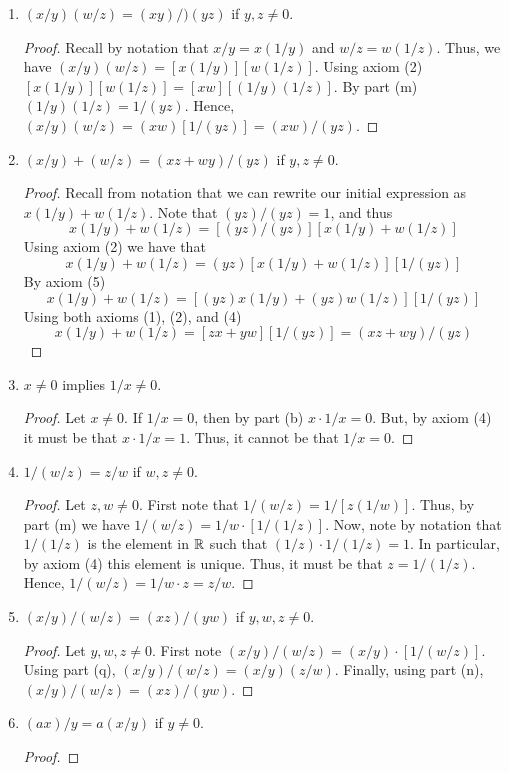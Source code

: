 \documentclass[12pt]{article}
\begin{document}
\begin{enumerate}[label=(\alph*)]
\begin{proof}
			that $(1/y)(1/z) = 1/(yz)$.
		\end{proof}
		\item $(x/y) (w/z) = (xy)/)(yz)$ if $y,z \neq 0$.
		\begin{proof}
			Recall by notation that $x/y = x(1/y)$ and $w/z = w(1/z)$. Thus, we have
			$(x/y)(w/z) = [x(1/y)][w(1/z)]$. Using axiom (2) 
			$[x(1/y)][w(1/z)] = [xw][(1/y)(1/z)]$. By part (m) $(1/y)(1/z) = 1/(yz)$. 
			Hence, $(x/y)(w/z) = (xw)[1/(yz)] = (xw)/(yz)$.
		\end{proof}
		\item $(x/y) + (w/z) = (xz + wy)/(yz)$ if $y,z \neq 0$.
		\begin{proof}
			Recall from notation that we can rewrite our initial expression as $x(1/y) + w(1/z)$.
			Note that $(yz)/(yz) = 1$, and thus
			$$
			x(1/y) + w(1/z) = [(yz)/(yz)][x(1/y) + w(1/z)]
			$$
			Using axiom (2) we have that 
			$$
			x(1/y) + w(1/z) = (yz)[x(1/y) + w(1/z)][1/(yz)]
			$$
			By axiom (5) 
			$$
			x(1/y) + w(1/z) = [(yz)x(1/y) + (yz)w(1/z)][1/(yz)]
			$$
			Using both axioms (1), (2), and (4)
			$$
			x(1/y) + w(1/z) = [zx + yw][1/(yz)] = (xz + wy)/(yz)
			$$
		\end{proof}
		\item $x \neq 0$ implies $1/x \neq 0$.
		\begin{proof}
			Let $x \neq 0$. If $1/x = 0$, then by part (b) $x \cdot 1/x = 0$. But, by axiom (4) it
			must be that $x \cdot 1/x = 1$. Thus, it cannot be that $1/x = 0$.
		\end{proof}
		\item $1/(w/z) = z/w$ if $w,z \neq 0$.
		\begin{proof}
			Let $z, w \neq 0$. First note that $1/(w/z) = 1/[z(1/w)]$. Thus, by part (m) we have
			$1/(w/z) = 1/w \cdot [1/(1/z)]$. Now, note by notation that $1/(1/z)$ is the element 
			in $\mathbb{R}$ such that $(1/z) \cdot 1/(1/z) = 1$. In particular, by axiom (4) this element is
			unique. Thus, it must be that $z = 1/(1/z)$. Hence, $1/(w/z) = 1/w \cdot z = z/w$.
		\end{proof}
		\item $(x/y)/(w/z) = (xz)/(yw)$ if $y,w,z \neq 0$.
		\begin{proof}
			Let $y, w, z \neq 0$. First note $(x/y)/(w/z) = (x/y) \cdot [1/(w/z)]$. Using part
			(q), $(x/y)/(w/z) = (x/y)(z/w)$. Finally, using part (n), $(x/y)/(w/z) = (xz)/(yw)$.
		\end{proof}
		\item $(ax)/y = a(x/y)$ if $y \neq 0$.
		\begin{proof}

\end{proof}
\end{enumerate}
\end{document}

